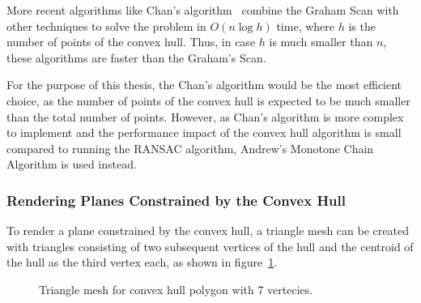 More recent algorithms like Chan's algorithm~\cite{chan_optimal_1996} combine the Graham Scan with other techniques to solve the problem in $O(n \log h)$ time,
where $h$ is the number of points of the convex hull.
Thus, in case $h$ is much smaller than $n$, these algorithms are faster than the Graham's Scan.

For the purpose of this thesis, the Chan's algorithm would be the most efficient choice,
as the number of points of the convex hull is expected to be much smaller than the total number of points.
However, as Chan's algorithm is more complex to implement and the performance impact of the convex hull algorithm
is small compared to running the RANSAC algorithm, Andrew's Monotone Chain Algorithm is used instead.

\subsubsection{Rendering Planes Constrained by the Convex Hull}
To render a plane constrained by the convex hull,
a triangle mesh can be created with triangles consisting of two subsequent vertices
of the hull and the centroid of the hull as the third vertex each, as shown in figure~\ref{fig:convex-hull-mesh}.
\begin{figure}[h!tbp]
    \centering
    \caption{Triangle mesh for convex hull polygon with 7 vertecies.}
    \label{fig:convex-hull-mesh}
\end{figure}

